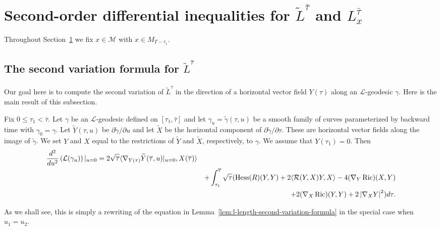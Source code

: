 \section{Second-order differential inequalities for $\widetilde L^{\bar\tau}$
and $L_x^{\bar\tau}$}\label{secondorder}

Throughout Section~\ref{secondorder} we fix $x\in {\mathcal M}$ with $x\in
M_{T-\tau_1}$.


\subsection{The second variation formula for $\widetilde L^{\bar\tau}$}

Our goal here is to compute the second variation of $\widetilde
L^{\bar\tau}$ in the direction of a horizontal vector field
$Y(\tau)$ along an ${\mathcal L}$-geodesic $\gamma$. Here is the
main result of this subsection.

\begin{proposition}\label{prop:l-length-second-variation-general}
\label{2ndvariation}

 Fix $0\le \tau_1<\bar \tau$.
Let $\gamma$ be an ${\mathcal L}$-geodesic defined on
$[\tau_1,\bar\tau]$ and let $\gamma_u=\widetilde\gamma(\tau,u)$ be a
smooth family of curves parameterized by backward time with
$\gamma_0=\gamma$. Let $\widetilde Y(\tau,u)$ be $\partial
\widetilde\gamma/\partial u$ and let $\widetilde X$ be the
horizontal component of $\partial \widetilde \gamma/\partial \tau$.
These are horizontal vector fields along the image of $\widetilde
\gamma$. We set $Y$ and $X$ equal to the restrictions of $\widetilde
Y$ and $\widetilde X$, respectively, to $\gamma$. We assume that
$Y(\tau_1)=0$. Then
\begin{eqnarray*}
\frac{d^2}{du^2}\left({\mathcal L}(\gamma_u)\right)|_{u=0}
 =  2\sqrt{\overline\tau}\langle \nabla_{Y(\tau)}\widetilde
Y(\overline\tau,u)|_{u=0},X(\overline\tau)\rangle \\
& & + \int_{\tau_1}^{\overline\tau}\sqrt{\tau}(\operatorname{Hess}(R)(Y,Y)
        +2\langle{\mathcal R}(Y,X)Y,X\rangle
        - 4(\nabla_{Y}\operatorname{Ric})(X,Y) \\
        & &  + 2(\nabla_{X}\operatorname{Ric})(Y,Y)+ 2\left\vert\nabla_{X} Y\right\vert^{2})d\tau.
\end{eqnarray*}
\end{proposition}


As we shall see, this is simply a rewriting of the equation in
Lemma~\ref{lem:l-length-second-variation-formula} in the special case when $u_1=u_2$.




